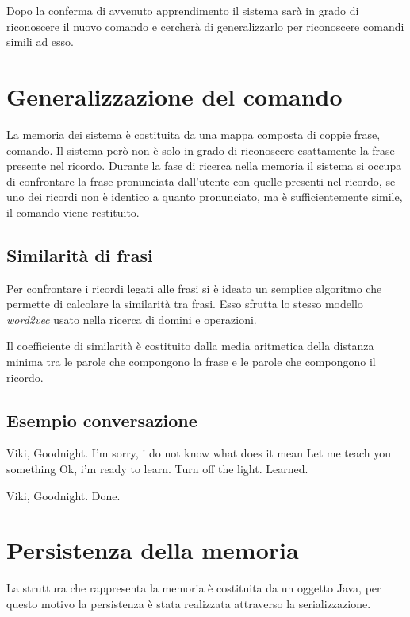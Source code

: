 \documentclass[twoside]{supsistudent}
\begin{document}
Dopo la conferma di avvenuto apprendimento il sistema sarà in grado di riconoscere il nuovo comando e cercherà di generalizzarlo per riconoscere comandi simili ad esso.
\section{Generalizzazione del comando}
La memoria dei sistema è costituita da una mappa composta di coppie frase, comando. Il sistema però non è solo in grado di riconoscere esattamente la frase presente nel ricordo.
Durante la fase di ricerca nella memoria il sistema si occupa di confrontare la frase pronunciata dall'utente con quelle presenti nel ricordo, se uno dei ricordi non è identico a quanto pronunciato, ma è sufficientemente simile, il comando viene restituito.
\subsection{Similarità di frasi}
Per confrontare i ricordi legati alle frasi si è ideato un semplice algoritmo che permette di calcolare la similarità tra frasi. Esso sfrutta lo stesso modello \textit{word2vec} usato nella ricerca di domini e operazioni.

Il coefficiente di similarità è costituito dalla media aritmetica della distanza minima tra le parole che compongono la frase e le parole che compongono il ricordo.

\subsection{Esempio conversazione}
\begin{dialogue}
 Viki, Goodnight.
 I'm sorry, i do not know what does it mean
 Let me teach you something
 Ok, i'm ready to learn.
 Turn off the light.
 Learned.
\end{dialogue}
\begin{dialogue}
 Viki, Goodnight.
 Done.
\end{dialogue}

\section{Persistenza della memoria}
La struttura che rappresenta la memoria è costituita da un oggetto Java, per questo motivo la persistenza è stata realizzata attraverso la serializzazione.
\end{document}
